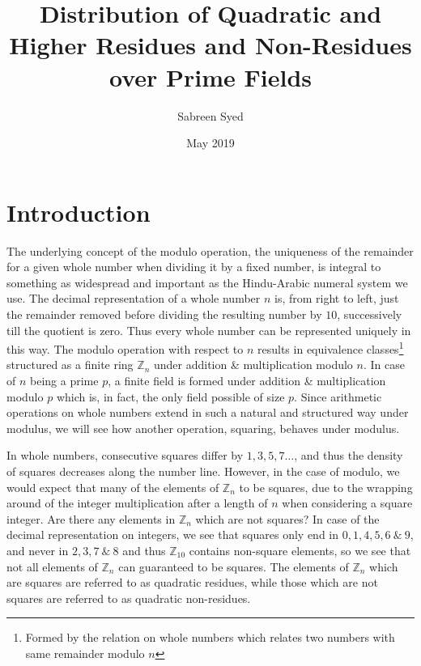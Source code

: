 \documentclass{report}
\title{Distribution of Quadratic and Higher Residues and Non-Residues over Prime Fields}
\author{
  Sabreen Syed\\
  \multicolumn{1}{p{.7\textwidth}}{\centering\emph{Department of Computer Science and Engineering\\
  Indian Institute of Technology Kanpur, India}}}
\date{May 2019}
\begin{document}

\maketitle

\tableofcontents
\newpage

\chapter{Introduction}
%
The underlying concept of the modulo operation, the uniqueness of the remainder for a given whole number when dividing it by a fixed number, is integral to something as widespread and important as the Hindu-Arabic numeral system we use. The decimal representation of a whole number $n$ is, from right to left, just the remainder removed before dividing the resulting number by $10$, successively till the quotient is zero. Thus every whole number can be represented uniquely in this way. The modulo operation with respect to $n$ results in equivalence classes\footnote {Formed by the relation on whole numbers which relates two numbers with same remainder modulo $n$} structured as a finite ring $\mathbb{Z}_n$ under addition \& multiplication modulo $n$.  In case of $n$ being a prime $p$, a finite field is formed under addition \& multiplication modulo $p$ which is, in fact, the only field possible of size $p$. Since arithmetic operations on whole numbers extend in such a natural and structured way under modulus, we will see how another operation, squaring, behaves under modulus.

In whole numbers, consecutive squares differ by $1,3,5,7 \ldots$, and thus the density of squares decreases along the number line. However, in the case of modulo, we would expect that many of the elements of $\mathbb{Z}_n$ to be squares, due to the wrapping around of the integer multiplication after a length of $n$ when considering a square integer. Are there any elements in $\mathbb{Z}_n$ which are not squares? In case of the decimal representation on integers, we see that squares only end in $0,1,4,5,6\  \& \ 9$, and never in $2,3,7 \  \& \  8$ and thus $\mathbb {Z}_{10}$ contains non-square elements, so we see that not all elements of $\mathbb{Z}_n$ can guaranteed to be squares. The elements of $\mathbb{Z}_n$ which are squares are referred to as quadratic residues, while those which are not squares are referred to as quadratic non-residues.
\end{document}

